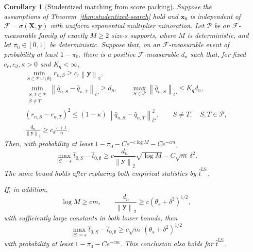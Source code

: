 \documentclass[a4paper,11pt,english]{article}
\newtheorem{corollary}[theorem]{Corollary}
\newcommand{\norm}[1]{\left\lVert #1\right\rVert}
\begin{document}
\begin{corollary}[Studentized matching from score packing]
\label{cor:studentized-score-matching}
Suppose the assumptions of Theorem~\ref{thm:studentized-search} hold and
$\mathbf x_0$ is independent of
$\mathcal F=\sigma(\mathbf X,\mathbf y)$ with uniform exponential
multiplier minoration.  Let $\mathcal P$ be an $\mathcal F$-measurable
family of exactly $M\ge2$ size-$s$ supports, where $M$ is deterministic,
and let $\pi_0\in[0,1]$ be deterministic.  Suppose that, on an
$\mathcal F$-measurable event of probability at least $1-\pi_0$, there is
a positive $\mathcal F$-measurable $d_n$ such that, for fixed
$c_r,c_d,\kappa>0$ and $K_q<\infty$,
\begin{equation}\label{eq:studentized-score-packing}
\begin{gathered}
 \min_{S\in\mathcal P\cup\{\emptyset\}}r_{n,S}
 \ge c_r\norm{\mathbf y}_2,\\
 \min_{\substack{S,T\in\mathcal P\\S\ne T}}
 \norm{\hat q_{n,S}-\hat q_{n,T}}_{\hat C}\ge d_n,
 \qquad
 \max_{S\in\mathcal P}\norm{\hat q_{n,S}}_{\hat C}
 \le K_qd_n,\\
 (r_{n,S}-r_{n,T})^2
 \le(1-\kappa)
 \norm{\hat q_{n,S}-\hat q_{n,T}}_{\hat C}^2,
 \qquad S\ne T,\quad S,T\in\mathcal P,\\
 \frac{d_n}{\norm{\mathbf y}_2}
 \ge c_d\frac{s+1}{n}.
\end{gathered}
\end{equation}
Then, with probability at least
$1-\pi_0-Ce^{-c\log M}-Ce^{-cm}$,
\begin{equation}\label{eq:studentized-score-packing-lower}
 \max_{|S|=s}\hat t_{0,S}-\hat t_{0,\emptyset}
 \ge
 c\frac{d_n}{\norm{\mathbf y}_2}\sqrt{\log M}
 -C\sqrt m\,\delta^2.
\end{equation}
The same bound holds after replacing both empirical statistics by
$\hat t^{\mathrm{LS}}$.

If, in addition,
\begin{equation}\label{eq:studentized-score-matching}
 \log M\ge cm,
 \qquad
 \frac{d_n}{\norm{\mathbf y}_2}
 \ge c(\theta_s+\delta^2)^{1/2},
\end{equation}
with sufficiently large constants in both lower bounds, then
\begin{equation}\label{eq:studentized-score-lower}
 \max_{|S|=s}\hat t_{0,S}-\hat t_{0,\emptyset}
 \ge c\sqrt m\,(\theta_s+\delta^2)^{1/2}
\end{equation}
with probability at least $1-\pi_0-Ce^{-cm}$.  This conclusion also
holds for $\hat t^{\mathrm{LS}}$.
\end{corollary}
\end{document}
